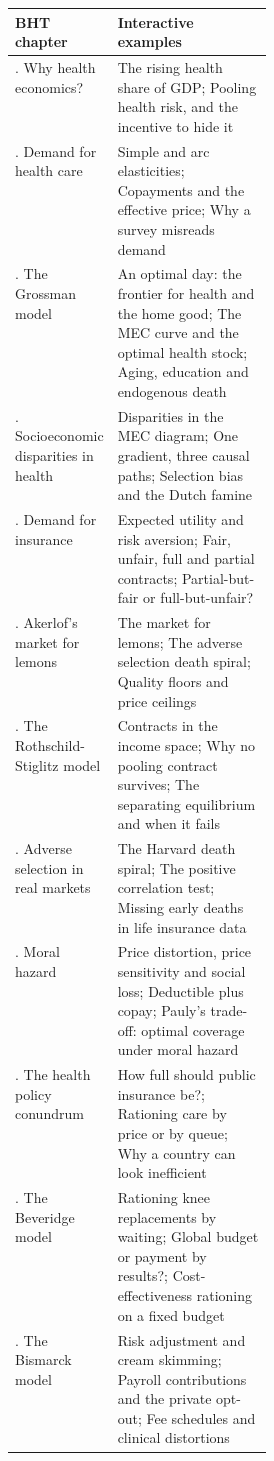 \begin{center}
\small
\begin{tabularx}{\linewidth}{@{}>{\raggedright\arraybackslash}p{0.30\linewidth} >{\raggedright\arraybackslash}X@{}}
\toprule
\textsf{\textbf{BHT chapter}} & \textsf{\textbf{Interactive examples}} \\
\midrule
1. Why health economics? & The rising health share of GDP; Pooling health risk, and the incentive to hide it \\
\addlinespace
2. Demand for health care & Simple and arc elasticities; Copayments and the effective price; Why a survey misreads demand \\
\addlinespace
3. The Grossman model & An optimal day: the frontier for health and the home good; The MEC curve and the optimal health stock; Aging, education and endogenous death \\
\addlinespace
4. Socioeconomic disparities in health & Disparities in the MEC diagram; One gradient, three causal paths; Selection bias and the Dutch famine \\
\addlinespace
7. Demand for insurance & Expected utility and risk aversion; Fair, unfair, full and partial contracts; Partial-but-fair or full-but-unfair? \\
\addlinespace
8. Akerlof's market for lemons & The market for lemons; The adverse selection death spiral; Quality floors and price ceilings \\
\addlinespace
9. The Rothschild-Stiglitz model & Contracts in the income space; Why no pooling contract survives; The separating equilibrium and when it fails \\
\addlinespace
10. Adverse selection in real markets & The Harvard death spiral; The positive correlation test; Missing early deaths in life insurance data \\
\addlinespace
11. Moral hazard & Price distortion, price sensitivity and social loss; Deductible plus copay; Pauly's trade-off: optimal coverage under moral hazard \\
\addlinespace
15. The health policy conundrum & How full should public insurance be?; Rationing care by price or by queue; Why a country can look inefficient \\
\addlinespace
16. The Beveridge model & Rationing knee replacements by waiting; Global budget or payment by results?; Cost-effectiveness rationing on a fixed budget \\
\addlinespace
17. The Bismarck model & Risk adjustment and cream skimming; Payroll contributions and the private opt-out; Fee schedules and clinical distortions \\

\end{tabularx}
\end{center}
